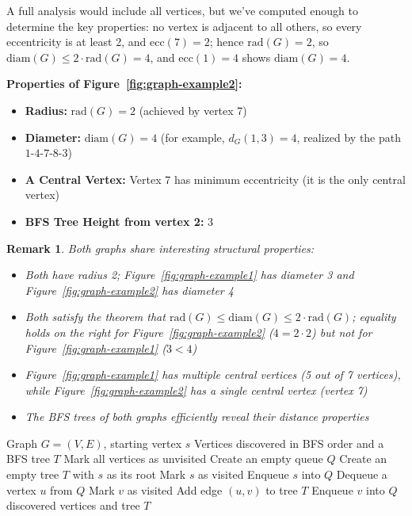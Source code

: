 \documentclass{article}
\newtheorem{remark}{Remark}
\theoremstyle{definition}
\begin{document}
\noindent A full analysis would include all vertices, but we've computed enough to determine the key properties: no vertex is adjacent to all others, so every eccentricity is at least 2, and $\text{ecc}(7) = 2$; hence $\text{rad}(G) = 2$, so $\text{diam}(G) \leq 2 \cdot \text{rad}(G) = 4$, and $\text{ecc}(1) = 4$ shows $\text{diam}(G) = 4$.

\noindent\textbf{Properties of Figure~\ref{fig:graph-example2}:}
\begin{itemize}
\item \textbf{Radius:} $\text{rad}(G) = 2$ (achieved by vertex 7)
\item \textbf{Diameter:} $\text{diam}(G) = 4$ (for example, $d_G(1,3) = 4$, realized by the path $1$-$4$-$7$-$8$-$3$)
\item \textbf{A Central Vertex:} Vertex 7 has minimum eccentricity (it is the only central vertex)
\item \textbf{BFS Tree Height from vertex 2:} 3
\end{itemize}
\pagebreak

\begin{remark}
Both graphs share interesting structural properties:
\begin{itemize}
\item Both have radius 2; Figure~\ref{fig:graph-example1} has diameter 3 and Figure~\ref{fig:graph-example2} has diameter 4
\item Both satisfy the theorem that $\text{rad}(G) \leq \text{diam}(G) \leq 2 \cdot \text{rad}(G)$; equality holds on the right for Figure~\ref{fig:graph-example2} ($4 = 2 \cdot 2$) but not for Figure~\ref{fig:graph-example1} ($3 < 4$)
\item Figure~\ref{fig:graph-example1} has multiple central vertices (5 out of 7 vertices), while Figure~\ref{fig:graph-example2} has a single central vertex (vertex 7)
\item The BFS trees of both graphs efficiently reveal their distance properties
\end{itemize}
\end{remark}

\begin{algorithm}
\caption{Breadth-First Search (BFS)}
\begin{algorithmic}[1]
\Require Graph $G = (V, E)$, starting vertex $s$
\Ensure Vertices discovered in BFS order and a BFS tree $T$
    \State Mark all vertices as unvisited
    \State Create an empty queue $Q$
    \State Create an empty tree $T$ with $s$ as its root
    \State Mark $s$ as visited
    \State Enqueue $s$ into $Q$
        \State Dequeue a vertex $u$ from $Q$
                \State Mark $v$ as visited
                \State Add edge $(u,v)$ to tree $T$
                \State Enqueue $v$ into $Q$
            \EndIf
        \EndFor
    \EndWhile
    \State \Return discovered vertices and tree $T$
\EndProcedure
\end{algorithmic}
\end{algorithm}
\end{document}
